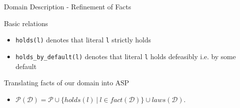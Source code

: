 \documentclass{beamer}
\begin{document}
  \begin{frame}{Domain Description - Refinement of Facts}

    Basic relations

    \begin{itemize}
      \item \texttt{holds(l)} denotes that literal \texttt{l} strictly holds  
      \item \texttt{holds\_by\_default(l)}
       denotes that literal \texttt{l} holds defeasibly i.e. by some default
    \end{itemize}

    Translating facts of our domain into ASP

    \begin{itemize}
      \item $\mathcal{P}(\mathcal{D}) = \mathcal{P} \cup \{ holds(l) \ | \ l \in fact(\mathcal{D}) \} \cup laws(\mathcal{D})$. 
    \end{itemize}

  \end{frame}


  
\end{document}
